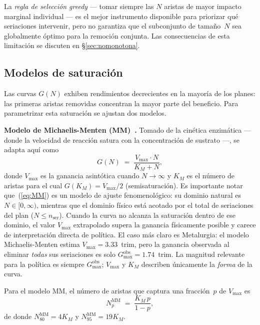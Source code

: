 \documentclass[11pt,letterpaper]{article}
\begin{document}
La \emph{regla de selección greedy} --- tomar siempre las $N$ aristas de mayor
impacto marginal individual --- es el mejor instrumento disponible para
priorizar qué seriaciones intervenir, pero no garantiza que el subconjunto de
tamaño~$N$ sea globalmente óptimo para la remoción conjunta.
Las consecuencias de esta limitación se discuten en
\S\ref{sec:nomonotona}.

\subsection{Modelos de saturación}
\label{sec:modelos_sat}

Las curvas $G(N)$ exhiben rendimientos decrecientes en la mayoría de los
planes: las primeras aristas removidas concentran la mayor parte del beneficio.
Para parametrizar esta saturación se ajustan dos modelos.

\noindent\textbf{Modelo de Michaelis-Menten (MM)~\cite{Michaelis1913}.}
Tomado de la cinética enzimática --- donde la velocidad de reacción satura
con la concentración de sustrato ---, se adapta aquí como
\begin{equation}
  G(N) \;=\; \frac{V_{\max}\cdot N}{K_M + N},
  \label{eq:MM}
\end{equation}
donde $V_{\max}$ es la ganancia asintótica cuando $N\to\infty$ y $K_M$ es el
número de aristas para el cual $G(K_M) = V_{\max}/2$ (semisaturación).
Es importante notar que~(\ref{eq:MM}) es un modelo de ajuste fenomenológico:
su dominio natural es $N\in[0,\infty)$, mientras que el dominio físico está
acotado por el total de seriaciones del plan ($N \leq n_{\mathrm{ser}}$).
Cuando la curva no alcanza la saturación dentro de ese dominio, el valor
$V_{\max}$ extrapolado supera la ganancia físicamente posible y carece de
interpretación directa de política.
El caso más claro es Metalurgia: el modelo Michaelis-Menten estima
$V_{\max} = 3.33$~trim, pero la ganancia observada al eliminar \emph{todas}
sus seriaciones es solo $G_{\max}^{\mathrm{obs}} = 1.74$~trim.
La magnitud relevante para la política es siempre $G_{\max}^{\mathrm{obs}}$;
$V_{\max}$ y $K_M$ describen únicamente la \emph{forma} de la curva.

Para el modelo MM, el número de aristas que captura una fracción~$p$ de
$V_{\max}$ es
\begin{equation}
  N_p^{\mathrm{MM}} \;=\; \frac{K_M\,p}{1-p},
  \label{eq:breakeven}
\end{equation}
de donde $N_{80}^{\mathrm{MM}} = 4K_M$ y $N_{95}^{\mathrm{MM}} = 19K_M$.
\end{document}
